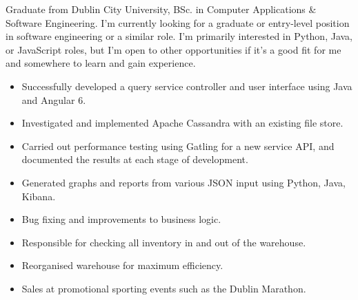 \documentclass[9pt,a4paper,ragged2e, normalphoto]{altacv-dean}
\begin{document}

\begin{fullwidth}
\makecvheader

\begin{flushleft}
    Graduate from Dublin City University, BSc. in Computer Applications \& Software Engineering. I'm currently looking for a graduate or entry-level position in software engineering or a similar role. I'm primarily interested in Python, Java, or JavaScript roles, but I'm open to other opportunities if it's a good fit for me and somewhere to learn and gain experience.
\end{flushleft}

    \begin{itemize}
        \item Successfully developed a query service controller and user interface using Java and Angular 6.
        \item Investigated and implemented Apache Cassandra with an existing file store.
        \item Carried out performance testing using Gatling for a new service API, and documented the results at each stage of development.
        \item Generated graphs and reports from various JSON input using Python, Java, Kibana.
        \item Bug fixing and improvements to business logic.
    \end{itemize}
    \divider
    
    \begin{itemize}
        \item  Responsible for checking all inventory in and out of the warehouse.
        \item Reorganised warehouse for maximum efficiency.
        \item Sales at promotional sporting events such as the Dublin Marathon.
    \end{itemize}

\end{fullwidth}
\end{document}
